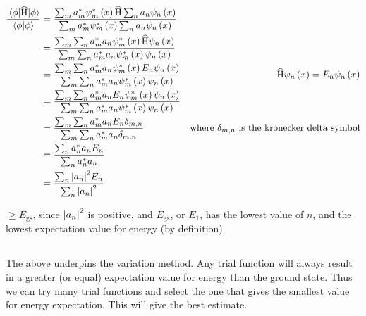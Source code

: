 \subsection{}
\begingroup
\addtolength{\jot}{0.8em}
\begin{align*}
    \frac{\expectationvalue{\widehat{\operatorname{H}}}{\phi}}{\braket{\phi}} & = \frac{\sum_m a_m^* \psi_m^* \del{x} \widehat{\operatorname{H}} \sum_n a_n \psi_n \del{x}}{\sum_m a_m^* \psi_m^* \del{x} \sum_n a_n \psi_n \del{x}}\\
    & = \frac{\sum_m \sum_n a_m^* a_n \psi_m^* \del{x} \widehat{\operatorname{H}} \psi_n \del{x}}{\sum_m \sum_n a_m^* a_n \psi_m^* \del{x} \psi_n \del{x}}\\
    & = \frac{\sum_m \sum_n a_m^* a_n \psi_m^* \del{x} E_n \psi_n \del{x}}{\sum_m \sum_n a_m^* a_n \psi_m^* \del{x} \psi_n \del{x}} & \widehat{\operatorname{H}} \psi_n \del{x} = E_n \psi_n \del{x}\\
    & = \frac{\sum_m \sum_n a_m^* a_n E_n \psi_m^* \del{x} \psi_n \del{x}}{\sum_m \sum_n a_m^* a_n \psi_m^* \del{x} \psi_n \del{x}}\\
    & = \frac{\sum_m \sum_n a_m^* a_n E_n \delta_{m,n}}{\sum_m \sum_n a_m^* a_n \delta_{m,n}} & \textrm{where $ \delta_{m,n} $ is the kronecker delta symbol}\\
    & = \frac{\sum_n a_n^* a_n E_n}{\sum_n a_n^* a_n}\\
    & = \frac{\sum_n \abs{a_n}^2 E_n}{\sum_n \abs{a_n}^2}\\
\end{align*}
\endgroup

$ \geq E_{\textrm{gs}} $, since $ \abs{a_n}^2 $ is positive, and $ E_{\textrm{gs}} $, or $ E_1 $, has the lowest value of $ n $, and the lowest expectation value for energy (by definition).

\subsection{}
The above underpins the variation method. Any trial function will always result in a greater (or equal) expectation value for energy than the ground state. Thus we can try many trial functions and select the one that gives the smallest value for energy expectation. This will give the best estimate.

